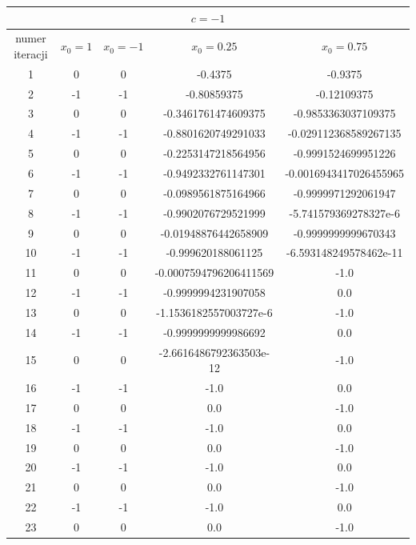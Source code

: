 \documentclass[]{article}
\begin{document}
	\begin{table}[!h]
		\centering
		\label{tab:table1}
		\begin{tabular}{|c|c|c|c|c|}
			\multicolumn{5}{c}{$c = -1$} \\
			\hline
			numer iteracji & $x_0 = 1$ & $x_0 = -1$ & $x_0 = 0.25$ & $x_0 = 0.75$ \\
			\hline
			1	&0 &	0 &	-0.4375 &	 -0.9375 \\ \hline	
			2	& -1 &	 -1 &	 -0.80859375 &	 -0.12109375 \\ \hline	
			3	& 0 &	 0 &	 -0.3461761474609375 &	 -0.9853363037109375 \\ \hline	
			4	& -1 &	 -1 &	 -0.8801620749291033 &	 -0.029112368589267135 \\ \hline	
			5	& 0 &	 0 &	 -0.2253147218564956 &	 -0.9991524699951226 \\ \hline	
			6	& -1 &	 -1 &	 -0.9492332761147301 &	 -0.0016943417026455965 \\ \hline	
			7	& 0 &	 0 &	 -0.0989561875164966 &	 -0.9999971292061947 \\ \hline	
			8	& -1 &	 -1 &	 -0.9902076729521999 &	 -5.741579369278327e-6 \\ \hline	
			9	& 0 &	 0 &	 -0.01948876442658909 &	 -0.9999999999670343 \\ \hline	
			10&	 -1 &	 -1 &	 -0.999620188061125 &	 -6.593148249578462e-11 \\ \hline	
			11&	 0 &	 0 &	 -0.0007594796206411569 &	 -1.0 \\ \hline	
			12&	 -1 &	 -1 &	 -0.9999994231907058 &	 0.0 \\ \hline	
			13&	 0 &	 0 &	 -1.1536182557003727e-6 &	 -1.0 \\ \hline	
			14&	 -1 &	 -1 &	 -0.9999999999986692 &	 0.0 \\ \hline	
			15&	 0 &	 0 &	 -2.6616486792363503e-12 &	 -1.0 \\ \hline	
			16&	 -1 &	 -1 &	 -1.0 &	 0.0 \\ \hline	
			17&	 0 &	 0 &	 0.0 &	 -1.0 \\ \hline	
			18&	 -1 &	 -1 &	 -1.0 &	 0.0 \\ \hline	
			19&	 0 &	 0 &	 0.0 &	 -1.0 \\ \hline	
			20&	 -1 &	 -1 &	 -1.0 &	 0.0 \\ \hline	
			21&	 0 &	 0 &	 0.0 &	 -1.0 \\ \hline	
			22&	 -1 &	 -1 &	 -1.0 &	 0.0 \\ \hline	
			23&	 0 &	 0 &	 0.0 &	 -1.0 \\ \hline	

\end{tabular}
\end{table}
\end{document}
